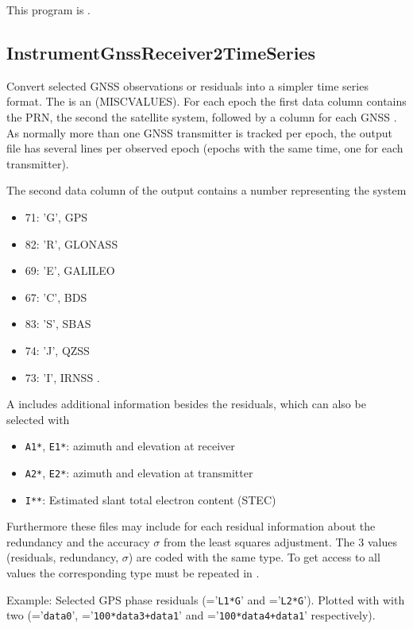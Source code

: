 This program is .
\clearpage
\subsection{InstrumentGnssReceiver2TimeSeries}\label{InstrumentGnssReceiver2TimeSeries}
Convert selected GNSS observations or residuals into a simpler time series format.
The  is an  (MISCVALUES).
For each epoch the first data column contains the PRN, the second the satellite system,
followed by a column for each GNSS .
As normally more than one GNSS transmitter is tracked per epoch, the output file
has several lines per observed epoch (epochs with the same time, one for each transmitter).

The second data column of the output contains a number representing the system
\begin{itemize}
\item 71: 'G', GPS
\item 82: 'R', GLONASS
\item 69: 'E', GALILEO
\item 67: 'C', BDS
\item 83: 'S', SBAS
\item 74: 'J', QZSS
\item 73: 'I', IRNSS .
\end{itemize}

A  includes additional information
besides the residuals, which can also be selected with 
\begin{itemize}
\item \verb|A1*|, \verb|E1*|: azimuth and elevation at receiver
\item \verb|A2*|, \verb|E2*|: azimuth and elevation at transmitter
\item \verb|I**|: Estimated slant total electron content (STEC)
\end{itemize}

Furthermore these files may include for each residual 
information about the redundancy and the accuracy $\sigma$ from the least squares adjustment.
The 3 values (residuals, redundancy, $\sigma$) are coded with the same type.
To get access to all values the corresponding type must be repeated in .

Example: Selected GPS phase residuals (='\verb|L1*G|' and ='\verb|L2*G|').
Plotted with  with two 
(='\verb|data0|', ='\verb|100*data3+data1|' and ='\verb|100*data4+data1|' respectively).


